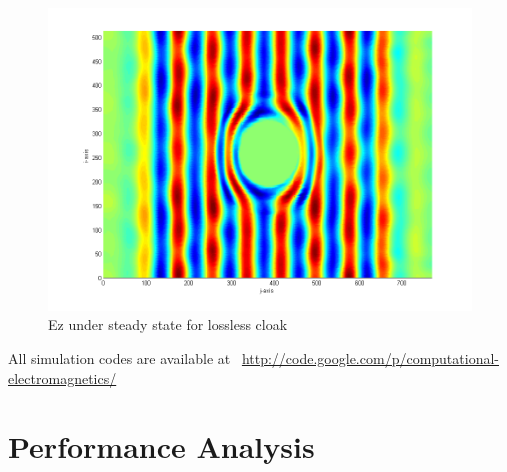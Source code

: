 \documentclass{article}
\begin{document}
\begin{figure}[t!]
\centering
\includegraphics[scale=0.3]{Figures/FigCh05_Ez_Cloak_SteadyStateLossless.png}
\caption{Ez under steady state for lossless cloak}
\label{fig:Ez-Cloak-SteadyStateLossless}
\end{figure}
All simulation codes are available at~ \url{http://code.google.com/p/computational-electromagnetics/}
\section{Performance Analysis}
\end{document}
